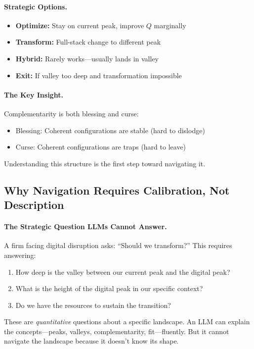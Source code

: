 \paragraph{Strategic Options.}
\begin{itemize}
  \item \textbf{Optimize:} Stay on current peak, improve $Q$ marginally
  \item \textbf{Transform:} Full-stack change to different peak
  \item \textbf{Hybrid:} Rarely works---usually lands in valley
  \item \textbf{Exit:} If valley too deep and transformation impossible
\end{itemize}

\paragraph{The Key Insight.}
Complementarity is both blessing and curse:
\begin{itemize}
  \item Blessing: Coherent configurations are stable (hard to dislodge)
  \item Curse: Coherent configurations are traps (hard to leave)
\end{itemize}

Understanding this structure is the first step toward navigating it.

\subsection{Why Navigation Requires Calibration, Not Description}

\paragraph{The Strategic Question LLMs Cannot Answer.}
A firm facing digital disruption asks: ``Should we transform?''
This requires answering:
\begin{enumerate}
    \item How deep is the valley between our current peak and the digital peak?
    \item What is the height of the digital peak in our specific context?
    \item Do we have the resources to sustain the transition?
\end{enumerate}

These are \emph{quantitative} questions about a specific landscape.
An LLM can explain the concepts---peaks, valleys, complementarity, fit---fluently.
But it cannot navigate the landscape because it doesn't know its shape.

